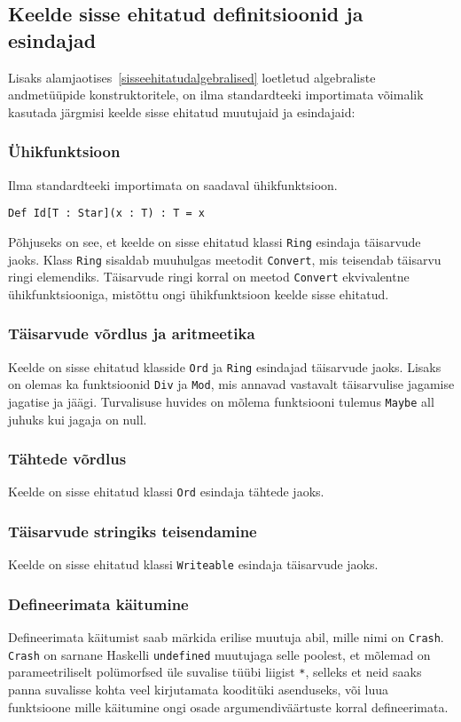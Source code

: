 \documentclass[12pt]{article}
\begin{document}
    \subsection{Keelde sisse ehitatud definitsioonid ja esindajad}
      Lisaks alamjaotises~\ref{sisseehitatudalgebralised} loetletud algebraliste andmetüüpide konstruktoritele, on ilma standardteeki importimata võimalik kasutada järgmisi keelde sisse ehitatud muutujaid ja esindajaid:
      \subsubsection{Ühikfunktsioon}
        Ilma standardteeki importimata on saadaval ühikfunktsioon.

        \begin{verbatim}Def Id[T : Star](x : T) : T = x\end{verbatim}

        Põhjuseks on see, et keelde on sisse ehitatud klassi \verb!Ring! esindaja täisarvude jaoks. Klass \verb!Ring! sisaldab muuhulgas meetodit \verb!Convert!, mis teisendab täisarvu ringi elemendiks. Täisarvude ringi korral on meetod \verb!Convert! ekvivalentne ühikfunktsiooniga, mistõttu ongi ühikfunktsioon keelde sisse ehitatud.
      \subsubsection{Täisarvude võrdlus ja aritmeetika}
        Keelde on sisse ehitatud klasside \verb!Ord! ja \verb!Ring! esindajad täisarvude jaoks. Lisaks on olemas ka funktsioonid \verb!Div! ja \verb!Mod!, mis annavad vastavalt täisarvulise jagamise jagatise ja jäägi. Turvalisuse huvides on mõlema funktsiooni tulemus \verb!Maybe! all juhuks kui jagaja on null.
      \subsubsection{Tähtede võrdlus}
        Keelde on sisse ehitatud klassi \verb!Ord! esindaja tähtede jaoks.
      \subsubsection{Täisarvude stringiks teisendamine}
        Keelde on sisse ehitatud klassi \verb!Writeable! esindaja täisarvude jaoks.
      \subsubsection{Defineerimata käitumine}
        Defineerimata käitumist saab märkida erilise muutuja abil, mille nimi on \verb!Crash!. \verb!Crash! on sarnane Haskelli \verb!undefined! muutujaga selle poolest, et mõlemad on parameetriliselt polümorfsed üle suvalise tüübi liigist \verb!*!, selleks et neid saaks panna suvalisse kohta veel kirjutamata kooditüki asenduseks, või luua funktsioone mille käitumine ongi osade argumendiväärtuste korral defineerimata.
\end{document}
